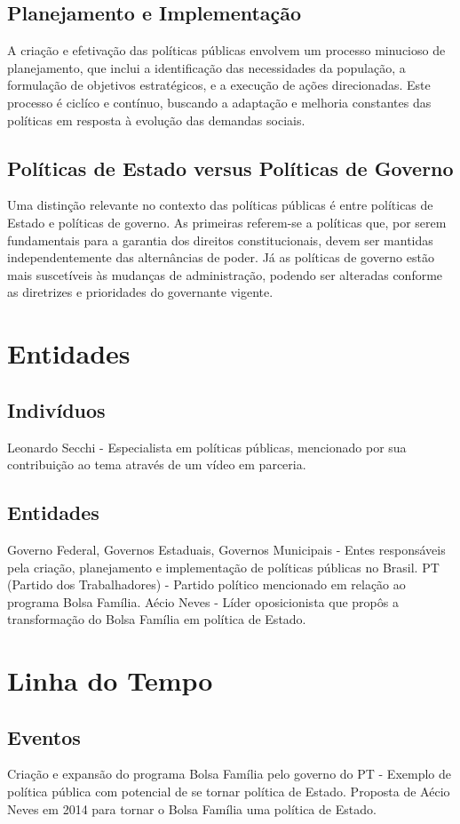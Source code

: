 \documentclass[
   article,       
   12pt,          
   oneside,       
   a4paper,       
   english,       
   brazil,        
   sumario=tradicional
   ]{abntex2}
\begin{document}
\subsection{Planejamento e Implementação}
A criação e efetivação das políticas públicas envolvem um processo minucioso de planejamento, que inclui a identificação das necessidades da população, a formulação de objetivos estratégicos, e a execução de ações direcionadas. Este processo é ciclíco e contínuo, buscando a adaptação e melhoria constantes das políticas em resposta à evolução das demandas sociais.

\subsection{Políticas de Estado versus Políticas de Governo}
Uma distinção relevante no contexto das políticas públicas é entre políticas de Estado e políticas de governo. As primeiras referem-se a políticas que, por serem fundamentais para a garantia dos direitos constitucionais, devem ser mantidas independentemente das alternâncias de poder. Já as políticas de governo estão mais suscetíveis às mudanças de administração, podendo ser alteradas conforme as diretrizes e prioridades do governante vigente.
\section{Entidades}
\subsection{Indivíduos}
Leonardo Secchi - Especialista em políticas públicas, mencionado por sua contribuição ao tema através de um vídeo em parceria.
\subsection{Entidades}
Governo Federal, Governos Estaduais, Governos Municipais - Entes responsáveis pela criação, planejamento e implementação de políticas públicas no Brasil.
PT (Partido dos Trabalhadores) - Partido político mencionado em relação ao programa Bolsa Família.
Aécio Neves - Líder oposicionista que propôs a transformação do Bolsa Família em política de Estado.
\section{Linha do Tempo}
\subsection{Eventos}
Criação e expansão do programa Bolsa Família pelo governo do PT - Exemplo de política pública com potencial de se tornar política de Estado.
Proposta de Aécio Neves em 2014 para tornar o Bolsa Família uma política de Estado.
\end{document}
